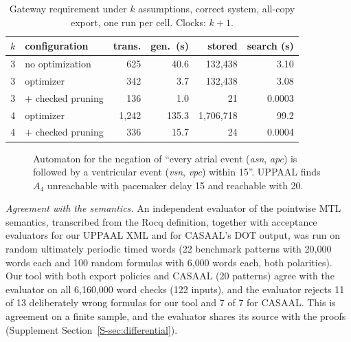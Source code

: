 \begin{table}[tbp]
\centering
\caption{Gateway requirement under $k$ assumptions, correct system, all-copy export, one run per cell. Clocks: $k+1$.}
\label{tab:ag-main}
\small
\begin{tabular}{rlrrrr}
\toprule
$k$ & configuration & trans. & gen.\ (s) & stored & search (s)\\
\midrule
3 & no optimization & 625 & 40.6 & 132{,}438 & 3.10\\
3 & optimizer & 342 & 3.7 & 132{,}438 & 3.08\\
3 & + checked pruning & 136 & 1.0 & 21 & 0.0003\\
4 & optimizer & 1{,}242 & 135.3 & 1{,}706{,}718 & 99.2\\
4 & + checked pruning & 336 & 15.7 & 24 & 0.0004\\
\bottomrule
\end{tabular}
\end{table}

\begin{figure}[t]
\centering
{}
\caption{Automaton for the negation of ``every atrial event (\textit{asn}, \textit{apc}) is followed by a ventricular event (\textit{vsn}, \textit{vpc}) within 15''. UPPAAL finds $A_4$ unreachable with pacemaker delay 15 and reachable with 20.}
\label{fig:pacemaker}
\end{figure}
\emph{Agreement with the semantics.} An independent evaluator of the pointwise MTL semantics, transcribed from the Rocq definition, together with acceptance evaluators for our UPPAAL XML and for CASAAL's DOT output, was run on random ultimately periodic timed words (22 benchmark patterns with 20{,}000 words each and 100 random formulas with 6{,}000 words each, both polarities). Our tool with both export policies and CASAAL (20 patterns) agree with the evaluator on all 6{,}160{,}000 word checks (122 inputs), and the evaluator rejects 11 of 13 deliberately wrong formulas for our tool and 7 of 7 for CASAAL. This is agreement on a finite sample, and the evaluator shares its source with the proofs (Supplement Section~\ref{S-sec:differential}).

